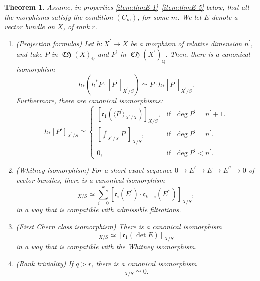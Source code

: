 \documentclass[JEP,XML,SOM,Unicode,published]{cedram}
\theoremstyle{plain}
\newtheorem{thm}{Theorem}
\theoremstyle{definition}
\newcommand{\QBbb}{\mathbb Q}
\newcommand{\cfrak}{\mathfrak c}
\newcommand{\bis}{\prime\prime}
\DeclareMathOperator{\CHfrak}{\mathfrak{CH}}
\begin{document}
\begin{thm}\label{thm:F}
Assume, in properties \eqref{item:thmE-1}--\eqref{item:thmE-5} below, that all the morphisms satisfy the condition $(C_{m})$, for some $m$. We let $E$ denote a vector bundle on $X$, of rank $r$.

\begin{enumerate}
\item\label{item:thmE-1} (Projection formulas) Let $h\colon X^{\prime}\to X$ be a morphism of relative dimension $n^{\prime}$, and take $P$ in $\CHfrak(X)_{\QBbb}$ and $P^{\prime}$ in $\CHfrak(X^{\prime})_{\QBbb}$.
Then, there is a canonical isomorphism
\begin{displaymath}
h_\ast (h^\ast P \cdot [P^{\prime}]_{X^{\prime}/S} ) \simeq P \cdot h_{\ast} [P^{\prime}]_{X^{\prime}/S}.
\end{displaymath}
Furthermore, there are canonical isomorphisms:
\begin{displaymath}
h_\ast [P']_{X^{\prime}/S} \simeq
\begin{cases}
\left[ \cfrak_1 (\langle P^{\prime} \rangle_{X^{\prime}/X})\right]_{X/S}, & \text{if }\; \deg P^{\prime}=n^{\prime}+1.\\[5pt]
\left[ \int_{X^{\prime}/X}P^{\prime} \right]_{X/S}, & \text{if }\; \deg P^{\prime} = n^{\prime}. \\[5pt]
0, & \text{if }\; \deg P^{\prime} < n^{\prime}.
\end{cases}
\end{displaymath}
\item (Whitney isomorphism) For a short exact sequence $0 \to E^{\prime}\to E \to E^{\bis} \to 0$ of vector bundles, there is a canonical isomorphism
\begin{displaymath}
[\cfrak_{k}(E)]_{X/S}\simeq \sum_{i=0}^{k} [\cfrak_{i}(E^{\prime})\cdot\cfrak_{k-i}(E^{\bis})]_{X/S},
\end{displaymath}
in a way that is compatible with admissible filtrations.
\item(First Chern class isomorphism) There is a canonical isomorphism
\begin{displaymath}
[\cfrak_1(E)]_{X/S} \simeq [\cfrak_1(\det E)]_{X/S}
\end{displaymath}
in a way that is compatible with the Whitney isomorphism.
\item (Rank triviality) If $q >r$, there is a canonical isomorphism
\begin{displaymath}
[ \cfrak_q(E)]_{X/S} \simeq 0.
\end{displaymath}

\end{enumerate}
\end{thm}
\end{document}
